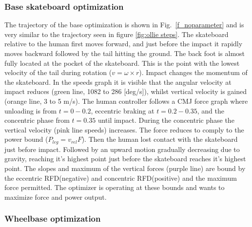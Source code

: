 \documentclass[default,iicol]{sn-jnl}
\begin{document}
\subsubsection{Base skateboard optimization}
The trajectory of the base optimization is shown in Fig.~\ref{f_noparameter} and is very similar to the trajectory seen in figure \ref{fig:ollie steps}. The skateboard relative to the human first moves forward, and just before the impact it rapidly moves backward followed by the tail hitting the ground. 
The back foot is almost fully located at the pocket of the skateboard. This is the point with the lowest velocity of the tail during rotation ($v = \omega \times r$). Impact changes the momentum of the skateboard. In the speeds graph it is visible that the angular velocity at impact reduces (green line, 1082 to 286 [deg/s]), whilst vertical velocity is gained (orange line, 3 to 5 m/s).
The human controller follows a CMJ force graph where unloading is from $t=0 - 0.2$, eccentric braking at $t=0.2-0.35$, and the concentric phase from $t=0.35$ until impact. During the concentric phase the vertical velocity (pink line speeds) increases. The force reduces to comply to the power bound ($P_{leg} = v_{rel} F$). Then the human lost contact with the skateboard just before impact. Followed by an upward motion gradually decreasing due to gravity, reaching it's highest point just before the skateboard reaches it's highest point. The slopes and maximum of the vertical forces (purple line) are bound by the eccentric RFD(negative) and concentric RFD(positive) and the maximum force permitted. The optimizer is operating at these bounds and wants to maximize force and power output. 

\subsubsection{Wheelbase optimization}
\end{document}
